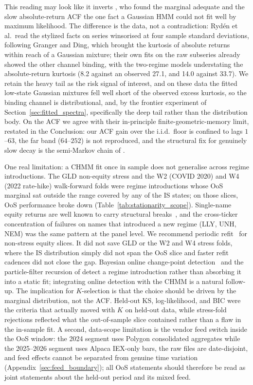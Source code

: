 This reading may look like it inverts \citet{ryden1998stylized}, who found the marginal adequate and the slow absolute-return ACF the one fact a Gaussian HMM could not fit well by maximum likelihood. The difference is the data, not a contradiction: Ryd\'{e}n et al.\ read the stylized facts on series winsorised at four sample standard deviations, following Granger and Ding, which brought the kurtosis of absolute returns within reach of a Gaussian mixture; their own fits on the raw subseries already showed the other channel binding, with the two-regime models understating the absolute-return kurtosis (8.2 against an observed 27.1, and 14.0 against 33.7). We retain the heavy tail as the risk signal of interest, and on these data the fitted low-state Gaussian mixtures fell well short of the observed excess kurtosis, so the binding channel is distributional, and, by the frontier experiment of Section~\ref{sec:fitted_spectra}, specifically the deep tail rather than the distribution body. On the ACF we agree with their in-principle finite-geometric-memory limit, restated in the Conclusion: our ACF gain over the i.i.d.\ floor is confined to lags $1$--$63$, the far band ($64$--$252$) is not reproduced, and the structural fix for genuinely slow decay is the semi-Markov chain of \citet{bulla2006stylized}.

One real limitation: a CHMM fit once in sample does not generalise across regime introductions. The GLD non-equity stress and the W2 (COVID 2020) and W4 (2022 rate-hike) walk-forward folds were regime introductions whose OoS marginal sat outside the range covered by any of the IS states; on those slices, OoS performance broke down (Table~\ref{tab:stationarity_scope}). Single-name equity returns are well known to carry structural breaks~\cite{pastorstambaugh2001equity, andreoughysels2002breaks, angtimmermann2012regime}, and the cross-ticker concentration of failures on names that introduced a new regime (LLY, UNH, NEM) was the same pattern at the panel level. We recommend periodic refit~\cite{pesarantimmermann2007window, cappe2011online} for non-stress equity slices. It did not save GLD or the W2 and W4 stress folds, where the IS distribution simply did not span the OoS slice and faster refit cadences did not close the gap. Bayesian online change-point detection~\cite{adams2007bayesian} and the particle-filter recursion of \citet{fearnhead2007online} detect a regime introduction rather than absorbing it into a static fit; integrating online detection with the CHMM is a natural follow-up. The implication for $K$-selection is that the choice should be driven by the marginal distribution, not the ACF. Held-out KS, log-likelihood, and BIC were the criteria that actually moved with $K$ on held-out data, while stress-fold rejections reflected what the out-of-sample slice contained rather than a flaw in the in-sample fit. A second, data-scope limitation is the vendor feed switch inside the OoS window: the 2024 segment uses Polygon consolidated aggregates while the 2025--2026 segment uses Alpaca IEX-only bars, the raw files are date-disjoint, and feed effects cannot be separated from genuine time variation (Appendix~\ref{sec:feed_boundary}); all OoS statements should therefore be read as joint statements about the held-out period and its mixed feed.


